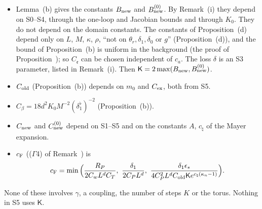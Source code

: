 \begin{detail}
\begin{step}
\begin{itemize}
\item Lemma~(b) gives the constants $B_{\rm new}$ and $B^{(0)}_{\rm new}$. By Remark~(i) they depend on S0--S4, through the one-loop and Jacobian bounds and through $K_0$. They do not depend on the domain constants. The constants of Proposition~(d) depend only on $L$, $M$, $\kappa$, $\rho$, ``not on $\theta_r,\delta_1,\delta_0$ or $g$'' (Proposition~(d)), and the bound of Proposition~(b) is uniform in the background (the proof of Proposition~); so $C_{\mathfrak e}$ can be chosen independent of $c_a$. The loss $\delta$ is an S3 parameter, listed in Remark~(i). Then $\mathsf K=2\max(B_{\rm new},B^{(0)}_{\rm new})$.
\item $C_{\rm old}$ (Proposition~(b)) depends on $m_0$ and $C_{\rm ex}$, both from S5.
\item $C_\beta=18d^2K_0M^{-2}(\delta_1^\flat)^{-2}$ (Proposition~(b)).
\item $C_{\rm new}$ and $C^{(0)}_{\rm new}$ depend on S1--S5 and on the constants $A$, $c_\natural$ of the Mayer expansion.
\item $c_{\rm F}$ (($\Gamma$4) of Remark~) is
\[
c_{\rm F}=\min\Big(\frac{R_P}{2C_wL^dC_T},\ \frac{\delta_1}{2C_PL^d},\ \frac{\delta_1\epsilon_*}{4C_P^2L^dC_{\rm old}\mathsf Ke^{c_\natural(\kappa_n-1)}}\Big).
\]
\end{itemize}
None of these involves $\gamma$, a coupling, the number of steps $K$ or the torus. Nothing in S5 uses $\mathsf K$.
\end{step}


\end{detail}
